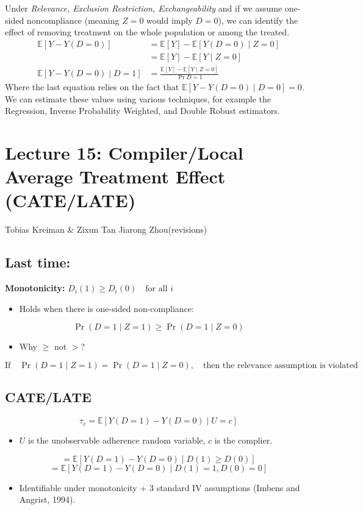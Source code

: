 Under \textit{Relevance, Exclusion Restriction, Exchangeability} and if we assume one-sided noncompliance (meaning \(Z = 0\) would imply \(D = 0\)), we can identify the effect of removing treatment on the whole population or among the treated.
\begin{align*}
    \mathbb{E}[Y - Y(D = 0)] &= \mathbb{E}[Y] - \mathbb{E}[Y(D = 0) \mid Z = 0]\\
    &= \mathbb{E}[Y] - \mathbb{E}[Y \mid Z = 0] \\
    \mathbb{E}[Y - Y(D = 0) \mid D = 1] &= \frac{\mathbb{E}[Y] - \mathbb{E}[Y \mid Z = 0]}{\Pr{D = 1}}
\end{align*}
Where the last equation relies on the fact that \(\mathbb{E}[Y - Y(D = 0) \mid D = 0] = 0\). We can estimate these values using various techniques, for example the Regression, Inverse Probability Weighted, and Double Robust estimators.

\section{Lecture 15: Compiler/Local Average Treatment Effect (CATE/LATE) }{Tobias Kreiman \& 
Zixun Tan Jiarong Zhou(revisions)}

\subsection{Last time:}
\textbf{Monotonicity:} \(D_i(1) \geq D_i(0) \quad \text{for all } i\)
\begin{itemize}
    \item Holds when there is one-sided non-compliance:
\end{itemize}
\[
\Pr(D = 1 \mid Z = 1) \geq \Pr(D = 1 \mid Z = 0)
\]
\begin{itemize}
    \item Why \(\geq\) not \(>\)?
\end{itemize}
\[
\text{If} \quad \Pr(D = 1 \mid Z = 1) = \Pr(D = 1 \mid Z = 0), \quad \text{then the relevance assumption is violated}
\]

\subsection{CATE/LATE}
\[
\tau_c = \mathbb{E}\left[ Y(D = 1) - Y(D = 0) \mid U = c \right]
\]
\begin{itemize}
    \item \(U\) is the unobservable adherence random variable, \(c\) is the complier.
\end{itemize}
\[
= \mathbb{E}\left[ Y(D = 1) - Y(D = 0) \mid D(1) \geq D(0) \right]
\]
\[
= \mathbb{E}\left[ Y(D = 1) - Y(D = 0) \mid D(1) = 1, D(0) = 0 \right]
\]
\begin{itemize}
    \item Identifiable under monotonicity + 3 standard IV assumptions (Imbens and Angrist, 1994).
\end{itemize}

